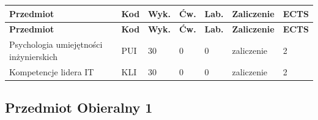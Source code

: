\documentclass[12pt,a4paper]{article}
\newcommand{\thdrule}{\noalign{\global\setlength{\extrarowheight}{0pt}}}
\newcommand{\thdend}{\noalign{\global\setlength{\extrarowheight}{4pt}}}
\begin{document}
{\scriptsize
\begin{longtable}{m{5.5cm}m{0.8cm}m{1cm}m{1cm}m{1cm}m{1.7cm}m{0.7cm}}
\thdrule\toprule
\rowcolor{pjatkRed}
{\color{white}\footnotesize\textbf{\vphantom{Ag}Przedmiot}} & {\color{white}\footnotesize\textbf{\vphantom{Ag}Kod}} & {\color{white}\footnotesize\textbf{\vphantom{Ag}Wyk.}} & {\color{white}\footnotesize\textbf{\vphantom{Ag}Ćw.}} & {\color{white}\footnotesize\textbf{\vphantom{Ag}Lab.}} & {\color{white}\footnotesize\textbf{\vphantom{Ag}Zaliczenie}} & {\color{white}\footnotesize\textbf{\vphantom{Ag}ECTS}} \\
\midrule\thdend
\endfirsthead
\thdrule\toprule
\rowcolor{pjatkRed}
{\color{white}\footnotesize\textbf{\vphantom{Ag}Przedmiot}} & {\color{white}\footnotesize\textbf{\vphantom{Ag}Kod}} & {\color{white}\footnotesize\textbf{\vphantom{Ag}Wyk.}} & {\color{white}\footnotesize\textbf{\vphantom{Ag}Ćw.}} & {\color{white}\footnotesize\textbf{\vphantom{Ag}Lab.}} & {\color{white}\footnotesize\textbf{\vphantom{Ag}Zaliczenie}} & {\color{white}\footnotesize\textbf{\vphantom{Ag}ECTS}} \\
\midrule\thdend
\endhead
\rowcolor{tableRowLight} Psychologia umiejętności inżynierskich & PUI & 30 & 0 & 0 & {\scriptsize zaliczenie} & 2 \\
\rowcolor{tableRowAlt} Kompetencje lidera IT & KLI & 30 & 0 & 0 & {\scriptsize zaliczenie} & 2 \\
\bottomrule
\end{longtable}}

\subsection*{Przedmiot Obieralny 1}
\end{document}
